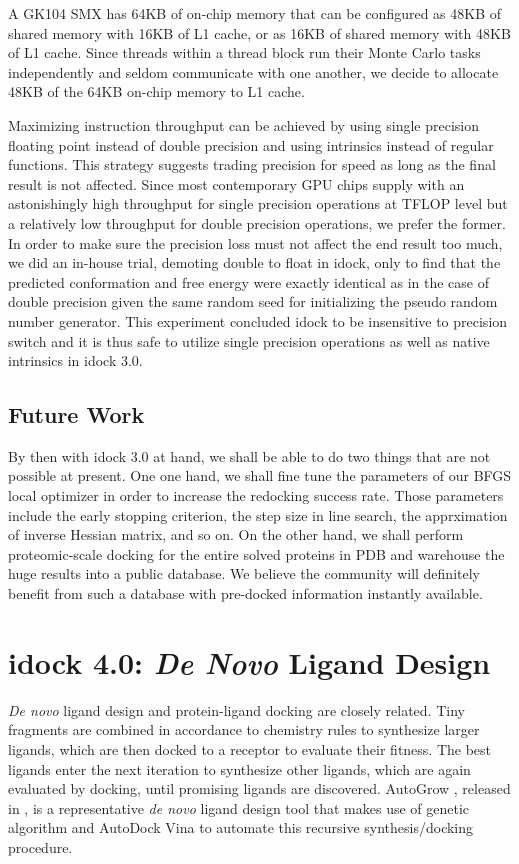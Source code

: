 A GK104 SMX has 64KB of on-chip memory that can be configured as 48KB of shared memory with 16KB of L1 cache, or as 16KB of shared memory with 48KB of L1 cache. Since threads within a thread block run their Monte Carlo tasks independently and seldom communicate with one another, we decide to allocate 48KB of the 64KB on-chip memory to L1 cache.

Maximizing instruction throughput can be achieved by using single precision floating point instead of double precision and using intrinsics instead of regular functions. This strategy suggests trading precision for speed as long as the final result is not affected. Since most contemporary GPU chips supply with an astonishingly high throughput for single precision operations at TFLOP level but a relatively low throughput for double precision operations, we prefer the former. In order to make sure the precision loss must not affect the end result too much, we did an in-house trial, demoting double to float in idock, only to find that the predicted conformation and free energy were exactly identical as in the case of double precision given the same random seed for initializing the pseudo random number generator. This experiment concluded idock to be insensitive to precision switch and it is thus safe to utilize single precision operations as well as native intrinsics in idock 3.0.

\subsection{Future Work}

By then with idock 3.0 at hand, we shall be able to do two things that are not possible at present. One one hand, we shall fine tune the parameters of our BFGS local optimizer in order to increase the redocking success rate. Those parameters include the early stopping criterion, the step size in line search, the apprximation of inverse Hessian matrix, and so on. On the other hand, we shall perform proteomic-scale docking for the entire solved proteins in PDB \citep{540,537} and warehouse the huge results into a public database. We believe the community will definitely benefit from such a database with pre-docked information instantly available.

\section{idock 4.0: \textit{De Novo} Ligand Design}

\textit{De novo} ligand design and protein-ligand docking are closely related. Tiny fragments are combined in accordance to chemistry rules to synthesize larger ligands, which are then docked to a receptor to evaluate their fitness. The best ligands enter the next iteration to synthesize other ligands, which are again evaluated by docking, until promising ligands are discovered. AutoGrow \citep{466}, released in \citeyear{466}, is a representative \textit{de novo} ligand design tool that makes use of genetic algorithm and AutoDock Vina \citep{595} to automate this recursive synthesis/docking procedure.


